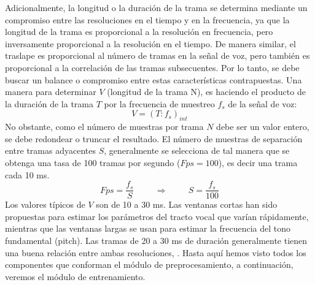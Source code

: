 \begin{enumerate}
\vskip 0.5cm
Adicionalmente, la longitud o la duración de la trama se determina mediante un compromiso entre las resoluciones en el tiempo y en la frecuencia, ya que la longitud de la trama es proporcional a la resolución en frecuencia, pero inversamente proporcional a la resolución en el tiempo. De manera similar, el traslape es proporcional al número de tramas en la señal de voz, pero también es proporcional a la correlación de las tramas subsecuentes. Por lo tanto, se debe buscar un balance o compromiso entre estas características contrapuestas.
\vskip 0.5cm
Una manera para determinar $V$ (longitud de la trama N), es haciendo el producto de la duración de la trama $T$ por la frecuencia de muestreo $f_{s}$ de la señal de voz:
\begin{equation}
\label{eq:ecuacion38}
V = (T:f_{s})_{int}
\end{equation}
No obstante, como el número de muestras por trama $N$ debe ser un valor entero, se debe redondear o truncar el resultado. El número de muestras de separación entre tramas adyacentes $S$, generalmente se selecciona de tal manera que se obtenga una tasa de 100 tramas por segundo ($Fps = 100$), es decir una trama cada 10 ms.
\begin{equation}
\label{eq:ecuacion39}
Fps = \frac{f_{s}}{S} \hspace{1cm} \Rightarrow \hspace{1cm} S = \frac{f_{s}}{100}
\end{equation}
Los valores típicos de $V$ son de 10 a 30 ms. Las ventanas cortas han sido propuestas para estimar los parámetros del tracto vocal que varían rápidamente, mientras que las ventanas largas se usan para estimar la frecuencia del tono fundamental (pitch). Las tramas de 20 a 30 ms de duración generalmente tienen una buena relación entre ambas resoluciones, \cite{eyra}.
\vskip 0.5cm
Hasta aquí hemos visto todos los componentes que conforman el módulo de preprocesamiento, a continuación, veremos el módulo de entrenamiento.
\end{enumerate}

